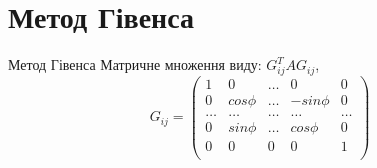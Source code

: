 \documentclass[serif,12pt,unicode]{beamer}
\begin{document}
\section{Метод Гівенса}
\begin{frame}{Метод Гівенса}
Матричне множення виду: $G^T_{ij} A G_{ij}$, 
\begin{equation*}
    G_{ij} = \begin{pmatrix}
    1 & 0 & \dots & 0 & 0\\
    0 & cos \phi & \dots & -sin \phi & 0\\
    \dots & \dots & \dots & \dots & \dots\\
    0 & sin \phi & \dots & cos \phi & 0\\
    0 & 0 & 0 & 0 & 1\\
    \end{pmatrix}
\end{equation*}
\end{frame}
\end{document}
